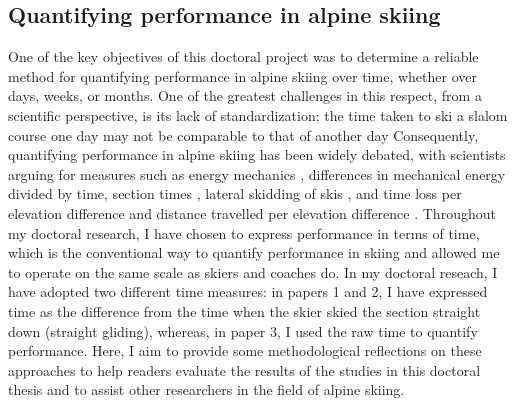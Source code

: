 \subsection{Quantifying performance in alpine skiing}
One of the key objectives of this doctoral project was to determine a reliable method for quantifying performance in alpine skiing over time, whether over days, weeks, or months. One of the greatest challenges in this respect, from a scientific perspective, is its lack of standardization; the time taken to ski a slalom course one day may not be comparable to that of another day  Consequently, quantifying performance in alpine skiing has been widely debated, with scientists arguing for measures such as energy mechanics \cite{supej_differential_2008, supej_how_2010, supej_mechanical_2011} , differences in mechanical energy divided by time, section times \cite{supej_relations_2006}, lateral skidding of skis \cite{kirby_development_2009}, and time loss per elevation difference and distance travelled per elevation difference \cite{federolf_quantifying_2012}. Throughout my doctoral research, I have chosen to express performance in terms of time, which is the conventional way to quantify performance in skiing and allowed me to operate on the same scale as skiers and coaches do. In my doctoral reseach, I have adopted two different time measures: in papers 1 and 2, I have expressed time as the difference from the time when the skier skied the section straight down (straight gliding), whereas, in paper 3, I used the raw time to quantify performance. Here, I aim to provide some methodological reflections on these approaches to help readers evaluate the results of the studies in this doctoral thesis and to assist other researchers in the field of alpine skiing. 

